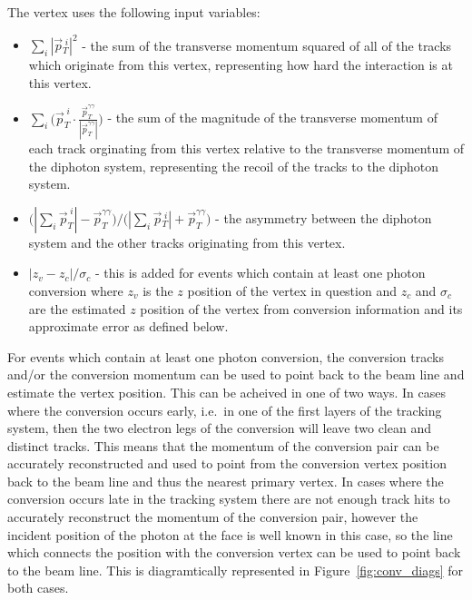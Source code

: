 The vertex \BDT uses the following input variables:

\begin{itemize}
  \item $\sum\limits_{i} |\vec{p}{}^{\;i}_{T}|^{2}$ - the sum of the transverse momentum squared of all of the tracks which originate from this vertex, representing how hard the interaction is at this vertex.
  \item $\sum\limits_{i} \bigl(\vec{p}^{\;i}_{T} \cdot \frac{\vec{p}^{\gamma\gamma}_{T}}{|\vec{p}^{\gamma\gamma}_{T}|}\bigr)$ - the sum of the magnitude of the transverse momentum of each track orginating from this vertex relative to the transverse momentum of the diphoton system, representing the recoil of the tracks to the diphoton system.
  \item $\bigr(|\sum\limits_{i} \vec{p}^{\;i}_{T}| - \vec{p}^{\gamma\gamma}_{T}\bigl) / \bigr(|\sum\limits_{i} \vec{p}{}^{\;i}_{T}| + \vec{p}^{\gamma\gamma}_{T}\bigl)$ - the asymmetry between the diphoton system and the other tracks originating from this vertex.
  \item $|z_{v}-z_{c}|/\sigma_{c}$ - this is added for events which contain at least one photon conversion where $z_{v}$ is the $z$ position of the vertex in question and $z_{c}$ and $\sigma_{c}$ are the estimated $z$ position of the vertex from conversion information and its approximate error as defined below.
\end{itemize}

For events which contain at least one photon conversion, the conversion tracks and/or the conversion momentum can be used to point back to the beam line and estimate the vertex position. This can be acheived in one of two ways. In cases where the conversion occurs early, i.e.\ in one of the first layers of the tracking system, then the two electron legs of the conversion will leave two clean and distinct tracks. This means that the momentum of the conversion pair can be accurately reconstructed and used to point from the conversion vertex position back to the beam line and thus the nearest primary vertex. In cases where the conversion occurs late in the tracking system there are not enough track hits to accurately reconstruct the momentum of the conversion pair, however the incident position of the photon at the \ECAL face is well known in this case, so the line which connects the \ECAL position with the conversion vertex can be used to point back to the beam line. This is diagramtically represented in Figure~\ref{fig:conv_diags} for both cases.

